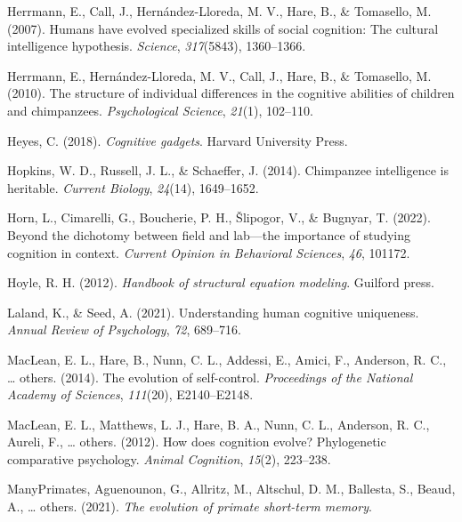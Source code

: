 \documentclass[
  man,floatsintext]{apa6}
\newlength{\cslhangindent}
\newlength{\cslentryspacingunit} %
\newenvironment{CSLReferences}[2] %
 {%
  \setlength{\parindent}{0pt}
  \ifodd #1
  \let\oldpar\par
  \def\par{\hangindent=\cslhangindent\oldpar}
  \fi
  \setlength{\parskip}{#2\cslentryspacingunit}
 }%
 {}
\begin{document}
\begin{CSLReferences}{1}{0}
\leavevmode{}%
Herrmann, E., Call, J., Hernández-Lloreda, M. V., Hare, B., \& Tomasello, M. (2007). Humans have evolved specialized skills of social cognition: The cultural intelligence hypothesis. \emph{Science}, \emph{317}(5843), 1360--1366.

\leavevmode{}%
Herrmann, E., Hernández-Lloreda, M. V., Call, J., Hare, B., \& Tomasello, M. (2010). The structure of individual differences in the cognitive abilities of children and chimpanzees. \emph{Psychological Science}, \emph{21}(1), 102--110.

\leavevmode{}%
Heyes, C. (2018). \emph{Cognitive gadgets}. Harvard University Press.

\leavevmode{}%
Hopkins, W. D., Russell, J. L., \& Schaeffer, J. (2014). Chimpanzee intelligence is heritable. \emph{Current Biology}, \emph{24}(14), 1649--1652.

\leavevmode{}%
Horn, L., Cimarelli, G., Boucherie, P. H., Šlipogor, V., \& Bugnyar, T. (2022). Beyond the dichotomy between field and lab---the importance of studying cognition in context. \emph{Current Opinion in Behavioral Sciences}, \emph{46}, 101172.

\leavevmode{}%
Hoyle, R. H. (2012). \emph{Handbook of structural equation modeling}. Guilford press.

\leavevmode{}%
Laland, K., \& Seed, A. (2021). Understanding human cognitive uniqueness. \emph{Annual Review of Psychology}, \emph{72}, 689--716.

\leavevmode{}%
MacLean, E. L., Hare, B., Nunn, C. L., Addessi, E., Amici, F., Anderson, R. C., \ldots{} others. (2014). The evolution of self-control. \emph{Proceedings of the National Academy of Sciences}, \emph{111}(20), E2140--E2148.

\leavevmode{}%
MacLean, E. L., Matthews, L. J., Hare, B. A., Nunn, C. L., Anderson, R. C., Aureli, F., \ldots{} others. (2012). How does cognition evolve? Phylogenetic comparative psychology. \emph{Animal Cognition}, \emph{15}(2), 223--238.

\leavevmode{}%
ManyPrimates, Aguenounon, G., Allritz, M., Altschul, D. M., Ballesta, S., Beaud, A., \ldots{} others. (2021). \emph{The evolution of primate short-term memory}.


\end{CSLReferences}
\end{document}
